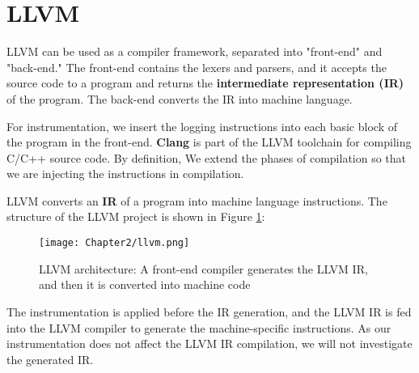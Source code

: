 \section{LLVM} \label{sec:2-llvm}

 \cite{llvm,lattner2004llvm}

\vspace{\baselineskip}

LLVM can be used as a compiler framework, separated into "front-end" and "back-end." The front-end contains the lexers and parsers, and it accepts the source code to a program and returns the \textbf{intermediate representation (IR)} of the program. The back-end converts the IR into machine language.

\vspace{\baselineskip}

For instrumentation, we insert the logging instructions into each basic block of the program in the front-end. \textbf{Clang} is part of the LLVM toolchain for compiling C/C++ source code. By definition, \cite{clang} We extend the phases of compilation so that we are injecting the instructions in compilation. 

\vspace{\baselineskip}

LLVM converts an \textbf{IR} of a program into machine language instructions. The structure of the LLVM project is shown in Figure \ref{fig:llvm}:

\begin{figure}[htpb]
    \texttt{[image: Chapter2/llvm.png]}
    \centering
    \captionsetup{justification=centering}
    \caption{LLVM architecture: A front-end compiler generates the LLVM IR, and then it is converted into machine code \cite{omni_sci}}
    \label{fig:llvm}
\end{figure}

The instrumentation is applied before the IR generation, and the LLVM IR is fed into the LLVM compiler to generate the machine-specific instructions. As our instrumentation does not affect the LLVM IR compilation, we will not investigate the generated IR.


